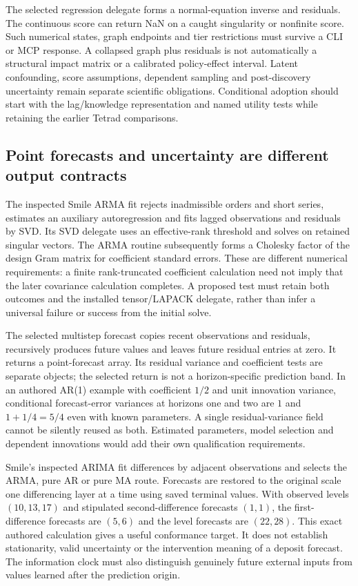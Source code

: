 The selected regression delegate forms a normal-equation inverse and residuals. The continuous score can return NaN on a caught singularity or nonfinite score. Such numerical states, graph endpoints and tier restrictions must survive a CLI or MCP response. A collapsed graph plus residuals is not automatically a structural impact matrix or a calibrated policy-effect interval. Latent confounding, score assumptions, dependent sampling and post-discovery uncertainty remain separate scientific obligations. Conditional adoption should start with the lag/knowledge representation and named utility tests while retaining the earlier Tetrad comparisons.\citep{exec25_jdyn_tetrad}

\subsection{Point forecasts and uncertainty are different output contracts}

The inspected Smile ARMA fit rejects inadmissible orders and short series, estimates an auxiliary autoregression and fits lagged observations and residuals by SVD. Its SVD delegate uses an effective-rank threshold and solves on retained singular vectors. The ARMA routine subsequently forms a Cholesky factor of the design Gram matrix for coefficient standard errors. These are different numerical requirements: a finite rank-truncated coefficient calculation need not imply that the later covariance calculation completes. A proposed test must retain both outcomes and the installed tensor/LAPACK delegate, rather than infer a universal failure or success from the initial solve.\citep{exec25_jdyn_smile}

The selected multistep forecast copies recent observations and residuals, recursively produces future values and leaves future residual entries at zero. It returns a point-forecast array. Its residual variance and coefficient tests are separate objects; the selected return is not a horizon-specific prediction band. In an authored AR(1) example with coefficient $1/2$ and unit innovation variance, conditional forecast-error variances at horizons one and two are $1$ and $1+1/4=5/4$ even with known parameters. A single residual-variance field cannot be silently reused as both. Estimated parameters, model selection and dependent innovations would add their own qualification requirements.\citep{exec25_jdyn_smile,exec25_jdyn_choice}

Smile's inspected ARIMA fit differences by adjacent observations and selects the ARMA, pure AR or pure MA route. Forecasts are restored to the original scale one differencing layer at a time using saved terminal values. With observed levels $(10,13,17)$ and stipulated second-difference forecasts $(1,1)$, the first-difference forecasts are $(5,6)$ and the level forecasts are $(22,28)$. This exact authored calculation gives a useful conformance target. It does not establish stationarity, valid uncertainty or the intervention meaning of a deposit forecast. The information clock must also distinguish genuinely future external inputs from values learned after the prediction origin.\citep{exec25_jdyn_smile,exec25_jdyn_choice}

